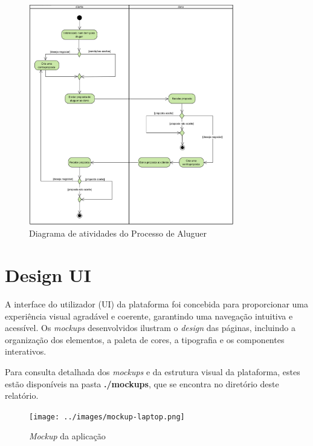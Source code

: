 \documentclass[a4paper, 12pt]{article} %
\begin{document}
\begin{figure}[ht]
	\centering
	\includegraphics[width=0.8\textwidth]{../images/activity-diagram-rentals.png}
	\caption{Diagrama de atividades do Processo de Aluguer}
	\label{fig:diagrama_atividades_aluguer}
\end{figure}


\newpage
\clearpage
\section{Design UI}
A interface do utilizador (UI) da plataforma foi concebida para proporcionar uma experiência visual agradável e coerente, garantindo uma navegação intuitiva e acessível. Os \textit{mockups} desenvolvidos ilustram o \textit{design} das páginas, incluindo a organização dos elementos, a paleta de cores, a tipografia e os componentes interativos.

Para consulta detalhada dos \textit{mockups} e da estrutura visual da plataforma, estes estão disponíveis na pasta \textbf{./mockups}, que se encontra no diretório deste relatório.

\begin{figure}[ht]
	\centering
	\texttt{[image: ../images/mockup-laptop.png]}
	\caption{\textit{Mockup} da aplicação}
	\label{fig:mockup}
\end{figure}

\end{document}
